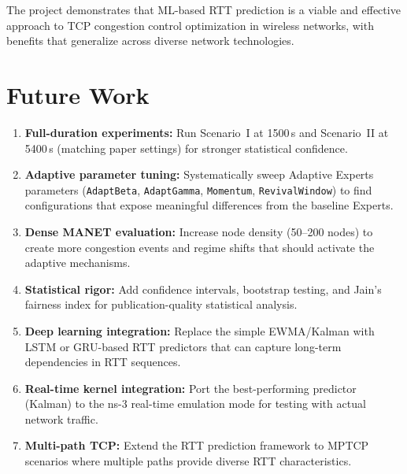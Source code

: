 \documentclass[12pt,a4paper]{article}
\begin{document}
The project demonstrates that ML-based RTT prediction is a viable and effective approach to TCP congestion control optimization in wireless networks, with benefits that generalize across diverse network technologies.

\section{Future Work}
\label{sec:future}

\begin{enumerate}
    \item \textbf{Full-duration experiments:} Run Scenario~I at 1500\,s and Scenario~II at 5400\,s (matching paper settings) for stronger statistical confidence.

    \item \textbf{Adaptive parameter tuning:} Systematically sweep Adaptive Experts parameters (\texttt{AdaptBeta}, \texttt{AdaptGamma}, \texttt{Momentum}, \texttt{RevivalWindow}) to find configurations that expose meaningful differences from the baseline Experts.

    \item \textbf{Dense MANET evaluation:} Increase node density (50--200 nodes) to create more congestion events and regime shifts that should activate the adaptive mechanisms.

    \item \textbf{Statistical rigor:} Add confidence intervals, bootstrap testing, and Jain's fairness index for publication-quality statistical analysis.

    \item \textbf{Deep learning integration:} Replace the simple EWMA/Kalman with LSTM or GRU-based RTT predictors that can capture long-term dependencies in RTT sequences.

    \item \textbf{Real-time kernel integration:} Port the best-performing predictor (Kalman) to the ns-3 real-time emulation mode for testing with actual network traffic.

    \item \textbf{Multi-path TCP:} Extend the RTT prediction framework to MPTCP scenarios where multiple paths provide diverse RTT characteristics.
\end{enumerate}
\end{document}
